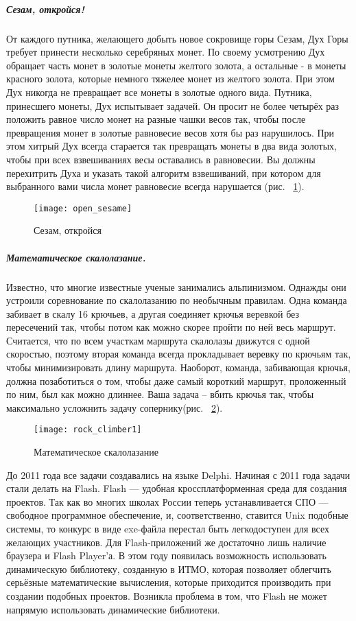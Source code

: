 \subparagraph{Сезам, откройся!}
От каждого путника, желающего добыть новое сокровище горы Сезам, Дух Горы требует принести несколько серебряных монет. По своему усмотрению Дух обращает часть монет в золотые монеты желтого золота, а остальные - в монеты красного золота, которые немного тяжелее монет из желтого золота. При этом Дух никогда не превращает все монеты в золотые одного вида. Путника, принесшего монеты, Дух испытывает задачей. Он просит не более четырёх раз положить равное число монет на разные чашки весов так, чтобы после превращения монет в золотые равновесие весов хотя бы раз нарушилось. При этом хитрый Дух всегда старается так превращать монеты в два вида золотых, чтобы при всех взвешиваниях весы оставались в равновесии. Вы должны перехитрить Духа и указать такой алгоритм взвешиваний, при котором для выбранного вами числа монет равновесие всегда нарушается (рис. ~\ref{open_sesame}).
\begin{figure}[!ht]
	\begin{center}
		\texttt{[image: open\_sesame]}
	\end{center}
	\caption{Сезам, откройся}
	\label{open_sesame}
\end{figure}
\subparagraph{Математическое скалолазание.}
Известно, что многие известные ученые занимались альпинизмом. Однажды они устроили соревнование по скалолазанию по необычным правилам. Одна команда забивает в скалу 16 крючьев, а другая соединяет крючья веревкой без пересечений так, чтобы потом как можно скорее пройти по ней весь маршрут. Считается, что по всем участкам маршрута скалолазы движутся с одной скоростью, поэтому вторая команда всегда прокладывает веревку по крючьям так, чтобы минимизировать длину маршрута. Наоборот, команда, забивающая крючья, должна позаботиться о том, чтобы даже самый короткий маршрут, проложенный по ним, был как можно длиннее. Ваша задача – вбить крючья так, чтобы максимально усложнить задачу сопернику(рис. ~\ref{rock_climber1}).
\begin{figure}[!ht]
	\begin{center}
		\texttt{[image: rock\_climber1]}
	\end{center}
	\caption{Математическое скалолазание}
	\label{rock_climber1}
\end{figure}

До 2011 года все задачи создавались на языке Delphi. Начиная с 2011 года задачи стали делать на Flash. Flash — удобная кроссплатформенная среда для создания проектов. Так как во многих школах России теперь устанавливается СПО — свободное программное обеспечение, и, соответственно, ставится Unix подобные системы, то конкурс в виде exe-файла перестал быть легкодоступен для всех желающих участников. Для Flash-приложений же достаточно лишь наличие браузера и Flash Player'а. В этом году появилась возможность использовать динамическую библиотеку, созданную в ИТМО, которая позволяет облегчить серьёзные математические вычисления, которые приходится производить при создании подобных проектов. Возникла проблема в том, что Flash не может напрямую использовать динамические библиотеки. 


